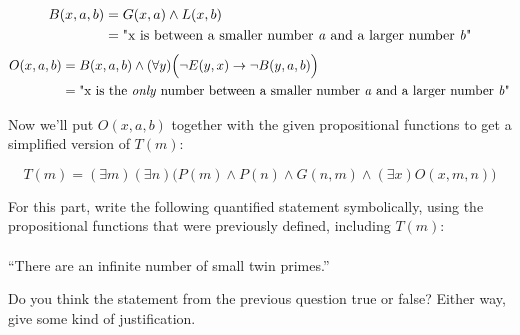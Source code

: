 \documentclass[12pt]{exam}
\begin{document}
\begin{questions}
{\begin{minipage}[t]{14.55cm}
\begin{center}
    			\end{center}
    			\begin{align*}
    				B(x,a,b) &= G(x,a) \wedge L(x,b) \\
    				&= \text{"x is between a smaller number \textit{a} and a larger number \textit{b}"}
    			\end{align*}
    			\begin{align*}
    				O(x,a,b) &= B(x,a,b) \wedge (\forall y)\Big(\neg E(y,x) \rightarrow \neg B(y,a,b)\Big) \\
    				&= \text{"x is the \textit{only} number between a smaller number \textit{a} and a larger number \textit{b}"}
    			\end{align*}
    			\begin{center}
    				Now we'll put $O(x,a,b)$ together with the given propositional functions to get a simplified version of $T(m)$:
    			\end{center}
    			$$T(m) = (\exists m)(\exists n)\Big(P(m) \wedge P(n) \wedge G(n,m) \wedge (\exists x)O(x,m,n)\Big)$$
    		\vspace{25pt}
    	\end{minipage}
    }

\clearpage
    
    \question[3] \label{two} For this part, write the following quantified statement symbolically, using the propositional functions that were previously defined, including $T(m)$: \\ 
    \\ 
    ``There are an infinite number of small twin primes.'' \\ 
    
\clearpage

	\question[1] Do you think the statement from the previous question true or false? Either way, give some kind of justification. \\ 
\end{questions}
\end{document}
